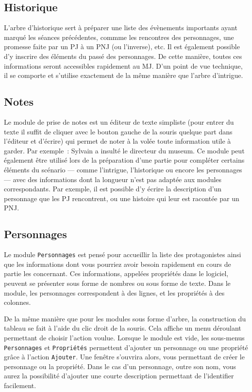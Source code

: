 \documentclass[a4paper,12pt]{article}
\newcommand*{\interfaceitem}[1]{\texttt{#1}}
\newcommand*{\guillemets}[1]{\og #1\fg{}\xspace}
\begin{document}
\subsection{Historique}
\label{sec:historique}

L'arbre d'historique sert à préparer une liste des évènements importants ayant marqué les séances précédentes, commme les rencontres des personnages, une promesse faite par un PJ à un PNJ (ou l'inverse), etc.
Il est également possible d'y inscrire des éléments du passé des personnages.
De cette manière, toutes ces informations seront accessibles rapidement au MJ.
D'un point de vue technique, il se comporte et s'utilise exactement de la même manière que l'arbre d'intrigue.

\subsection{Notes}
\label{sec:notes}

Le module de prise de notes est un éditeur de texte simpliste (pour entrer du texte il suffit de cliquer avec le bouton gauche de la souris quelque part dans l'éditeur et d'écrire) qui permet de noter à la volée toute information utile à garder.
Par exemple~: \guillemets{Sylvain a insulté le directeur du museum}.
Ce module peut également être utilisé lors de la préparation d'une partie pour compléter certains éléments du scénario --- comme l'intrigue, l'historique ou encore les personnages --- avec des informations dont la longueur n'est pas adaptée aux modules correspondants.
Par exemple, il est possible d'y écrire la description d'un personnage que les PJ rencontrent, ou une histoire qui leur est racontée par un PNJ.

\subsection{Personnages}
\label{sec:perso}

Le module \interfaceitem{Personnages} est pensé pour accueillir la liste des protagonistes ainsi que les informations dont vous pourriez avoir besoin rapidement en cours de partie les concernant.
Ces informations, appelées \guillemets{propriétés} dans le logiciel, peuvent se présenter sous forme de nombres ou sous forme de texte.
Dans le module, les personnages correspondent à des lignes, et les propriétés à des colonnes.

De la même manière que pour les modules sous forme d'arbre, la construction du tableau se fait à l'aide du clic droit de la souris.
Cela affiche un menu déroulant permettant de choisir l'action voulue.
Lorsque le module est vide, les sous-menus \interfaceitem{Personnages} et \interfaceitem{Propriétés} permettent d'ajouter un personnage ou une propriété grâce à l'action \interfaceitem{Ajouter}.
Une fenêtre s'ouvrira alors, vous permettant de créer le personnage ou la propriété.
Dans le cas d'un personnage, outre son nom, vous aurez la possibilité d'ajouter une courte description permettant de l'identifier facilement.
\end{document}
